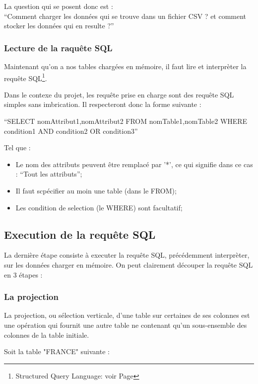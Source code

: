 \documentclass[oneside,13pt,a4paper]{report}
\begin{document}
La question qui se posent donc est : \\ \enquote{Comment charger les données qui se trouve dans un fichier CSV ? et comment stocker les données qui en resulte ?}

\subsubsection{Lecture de la raquête SQL}

Maintenant qu'on a nos tables chargées en mémoire, il faut lire et interprèter la requête SQL\footnote{Structured Query Language: voir Page \pageref{sql}}.

Dans le contexe du projet, les requête prise en charge sont des requête SQL simples sans imbrication. Il respecteront donc la forme suivante : 

\enquote{SELECT nomAttribut1,nomAttribut2 FROM nomTable1,nomTable2 WHERE condition1 AND condition2 OR condition3}

Tel que : 
\begin{itemize}
	\item Le nom des attributs peuvent être remplacé par '*', ce qui signifie dans ce cas : \enquote{Tout les attributs};
	\item Il faut scpécifier au moin une table (dans le FROM);
	\item Les condition de selection (le WHERE) sont facultatif;
\end{itemize}
\vspace{0.3cm}


\subsection{Execution de la requête SQL}

La dernière étape consiste à executer la requête SQL, précédemment interprèter, sur les données charger en mémoire.
On peut clairement découper la requête SQL en 3 étapes :

\subsubsection{La projection}

La projection, ou sélection verticale, d'une table sur certaines de ses colonnes est une opération qui fournit une autre table ne contenant qu'un sous-ensemble des colonnes de la table initiale.

Soit la table "FRANCE" suivante :
\end{document}
